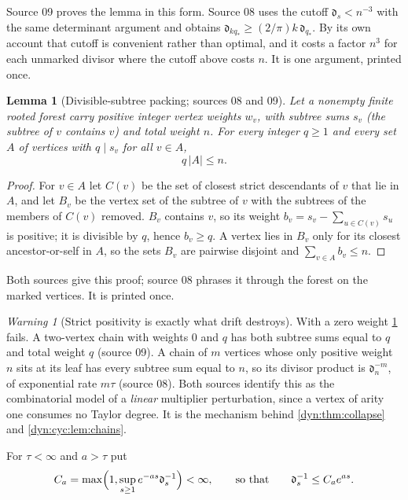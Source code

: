 \documentclass[11pt,letterpaper]{article}
\newtheorem{lemma}[lemma]{Lemma}
\theoremstyle{definition}
\theoremstyle{remark}
\newtheorem{warning}[warning]{Warning}
\numberwithin{equation}{section}
\begin{document}
Source 09 proves the lemma in this form. Source 08 uses the cutoff
$\mathfrak d_s<n^{-3}$ with the same determinant argument and obtains
$\mathfrak d_{kq_*}\ge(2/\pi)k\,\mathfrak d_{q_*}$. By its own account that
cutoff is convenient rather than optimal, and it costs a factor $n^{3}$ for
each unmarked divisor where the cutoff above costs $n$. It is one argument,
printed once.

\begin{lemma}[Divisible-subtree packing; sources 08 and 09]
\label{dyn:esm:lem:packing}
Let a nonempty finite rooted forest carry positive integer vertex weights
$w_v$, with subtree sums $s_v$ (the subtree of $v$ contains $v$) and total
weight $n$. For every integer $q\ge1$ and every set $A$ of vertices with
$q\mid s_v$ for all $v\in A$,
\begin{equation}\label{dyn:esm:eq:pack}
 q\,|A|\le n .
\end{equation}
\end{lemma}
\begin{proof}
For $v\in A$ let $C(v)$ be the set of closest strict descendants of $v$ that
lie in $A$, and let $B_v$ be the vertex set of the subtree of $v$ with the
subtrees of the members of $C(v)$ removed. $B_v$ contains $v$, so its weight
$b_v=s_v-\sum_{u\in C(v)}s_u$ is positive; it is divisible by $q$, hence
$b_v\ge q$. A vertex lies in $B_v$ only for its closest ancestor-or-self in
$A$, so the sets $B_v$ are pairwise disjoint and $\sum_{v\in A}b_v\le n$.
\end{proof}

Both sources give this proof; source 08 phrases it through the forest on
the marked vertices. It is printed once.

\begin{warning}[Strict positivity is exactly what drift destroys]
\label{dyn:esm:warn:zero}
With a zero weight \cref{dyn:esm:lem:packing} fails. A two-vertex chain with
weights $0$ and $q$ has both subtree sums equal to $q$ and total weight $q$
(source 09). A chain of $m$ vertices whose only positive weight $n$ sits at
its leaf has every subtree sum equal to $n$, so its divisor product is
$\mathfrak d_n^{-m}$, of exponential rate $m\tau$ (source 08). Both sources
identify this as the combinatorial model of a \emph{linear} multiplier
perturbation, since a vertex of arity one consumes no Taylor degree. It is
the mechanism behind \cref{dyn:thm:collapse} and \cref{dyn:cyc:lem:chains}.
\end{warning}

For $\tau<\infty$ and $a>\tau$ put
\begin{equation}\label{dyn:esm:eq:Ca}
 C_a=\max\Bigl(1,\sup_{s\ge1}e^{-as}\mathfrak d_s^{-1}\Bigr)<\infty,
 \qquad\text{so that}\qquad \mathfrak d_s^{-1}\le C_ae^{as}.
\end{equation}
\end{document}
